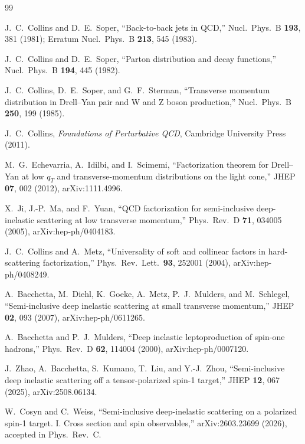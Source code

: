 \documentclass[11pt]{article}
\begin{document}
\small
\begin{thebibliography}{99}

J.~C.~Collins and D.~E.~Soper,
``Back-to-back jets in QCD,''
Nucl.\ Phys.\ B \textbf{193}, 381 (1981);
Erratum Nucl.\ Phys.\ B \textbf{213}, 545 (1983).

J.~C.~Collins and D.~E.~Soper,
``Parton distribution and decay functions,''
Nucl.\ Phys.\ B \textbf{194}, 445 (1982).

J.~C.~Collins, D.~E.~Soper, and G.~F.~Sterman,
``Transverse momentum distribution in Drell--Yan pair and W and Z boson production,''
Nucl.\ Phys.\ B \textbf{250}, 199 (1985).

J.~C.~Collins,
\emph{Foundations of Perturbative QCD},
Cambridge University Press (2011).

M.~G.~Echevarria, A.~Idilbi, and I.~Scimemi,
``Factorization theorem for Drell--Yan at low \(q_T\) and transverse-momentum distributions on the light cone,''
JHEP \textbf{07}, 002 (2012), arXiv:1111.4996.

X.~Ji, J.-P.~Ma, and F.~Yuan,
``QCD factorization for semi-inclusive deep-inelastic scattering at low transverse momentum,''
Phys.\ Rev.\ D \textbf{71}, 034005 (2005), arXiv:hep-ph/0404183.

J.~C.~Collins and A.~Metz,
``Universality of soft and collinear factors in hard-scattering factorization,''
Phys.\ Rev.\ Lett.\ \textbf{93}, 252001 (2004), arXiv:hep-ph/0408249.

A.~Bacchetta, M.~Diehl, K.~Goeke, A.~Metz, P.~J.~Mulders, and M.~Schlegel,
``Semi-inclusive deep inelastic scattering at small transverse momentum,''
JHEP \textbf{02}, 093 (2007), arXiv:hep-ph/0611265.

A.~Bacchetta and P.~J.~Mulders,
``Deep inelastic leptoproduction of spin-one hadrons,''
Phys.\ Rev.\ D \textbf{62}, 114004 (2000), arXiv:hep-ph/0007120.

J.~Zhao, A.~Bacchetta, S.~Kumano, T.~Liu, and Y.-J.~Zhou,
``Semi-inclusive deep inelastic scattering off a tensor-polarized spin-1 target,''
JHEP \textbf{12}, 067 (2025), arXiv:2508.06134.

W.~Cosyn and C.~Weiss,
``Semi-inclusive deep-inelastic scattering on a polarized spin-1 target. I. Cross section and spin observables,''
arXiv:2603.23699 (2026), accepted in Phys.\ Rev.\ C.


\end{thebibliography}
\end{document}
